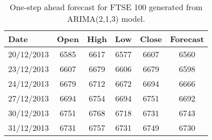\begin{table}[ht]
\centering
\caption[Forecast for FTSE 100 generated from the ARIMA model]{One-step ahead forecast for FTSE 100 generated from ARIMA(2,1,3) model.} 
\label{tab:chp_ts:ftse_100_fcast}
\begin{tabular}{lccccc}
  \toprule Date & Open & High & Low & Close & Forecast \\ 
  \midrule 20/12/2013 & 6585 & 6617 & 6577 & 6607 & 6560 \\ 
  23/12/2013 & 6607 & 6679 & 6606 & 6679 & 6598 \\ 
  24/12/2013 & 6679 & 6712 & 6672 & 6694 & 6666 \\ 
  27/12/2013 & 6694 & 6754 & 6694 & 6751 & 6692 \\ 
  30/12/2013 & 6751 & 6768 & 6718 & 6731 & 6743 \\ 
  31/12/2013 & 6731 & 6757 & 6731 & 6749 & 6730 \\ 
   \bottomrule \end{tabular}
\end{table}
